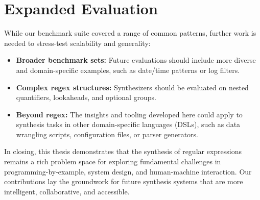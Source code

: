 \section{Expanded Evaluation}

\indent\indent While our benchmark suite covered a range of common patterns, further work is needed to stress-test scalability and generality:

\begin{itemize}
  \item \textbf{Broader benchmark sets:} Future evaluations should include more diverse and domain-specific examples, such as date/time patterns or log filters.
  \item \textbf{Complex regex structures:} Synthesizers should be evaluated on nested quantifiers, lookaheads, and optional groups.
  \item \textbf{Beyond regex:} The insights and tooling developed here could apply to synthesis tasks in other domain-specific languages (DSLs), such as data wrangling scripts, configuration files, or parser generators.
\end{itemize}

\vspace{1em}

\noindent In closing, this thesis demonstrates that the synthesis of regular expressions remains a rich problem space for exploring fundamental challenges in programming-by-example, system design, and human-machine interaction. Our contributions lay the groundwork for future synthesis systems that are more intelligent, collaborative, and accessible.




